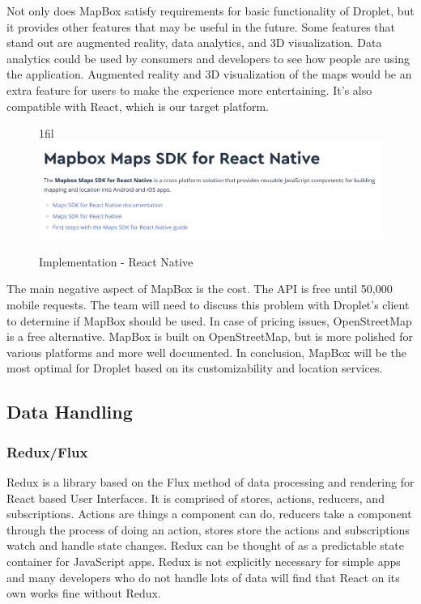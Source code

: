 \documentclass[draftclsnofoot, onecolumn, letterpaper,10pt,compsoc]{IEEEtran}
\makeatletter
\newcommand*{\centerfloat}{%
  \parindent \z@
  \leftskip \z@ \@plus 1fil \@minus \textwidth
  \rightskip\leftskip
  \parfillskip \z@skip}
\newcommand*{\centerfloat}{%
  \parindent \z@
  \leftskip \z@ \@plus 1fil \@minus \textwidth
  \rightskip\leftskip
  \parfillskip \z@skip}
\makeatother
\begin{document}
Not only does MapBox satisfy requirements for basic functionality of Droplet, but it provides other features that may be useful in the future. Some features that stand out are augmented reality, data analytics, and 3D visualization. Data analytics could be used by consumers and developers to see how people are using the application. Augmented reality and 3D visualization of the maps would be an extra feature for users to make the experience more entertaining. It's also compatible with React, which is our target platform.

\begin{figure}[H]
    \centerfloat
    \includegraphics[scale=.2]{images/MapBoxReactNative.jpg}
    \caption{Implementation - React Native}
    \label{fig:my_label}
\end{figure}

The main negative aspect of MapBox is the cost. The API is free until 50,000 mobile requests. The team will need to discuss this problem with Droplet's client to determine if MapBox should be used. In case of pricing issues, OpenStreetMap is a free alternative. MapBox is built on OpenStreetMap, but is more polished for various platforms and more well documented. In conclusion, MapBox will be the most optimal for Droplet based on its customizability and location services.

\subsection{Data Handling}

\subsubsection{Redux/Flux}
Redux is a library based on the Flux method of data processing and rendering for React based User Interfaces. It is comprised of stores, actions, reducers, and subscriptions. Actions are things a component can do, reducers take a component through the process of doing an action, stores store the actions and subscriptions watch and handle state changes. Redux can be thought of as a predictable state container for JavaScript apps. Redux is not explicitly necessary for simple apps and many developers who do not handle lots of data will find that React on its own works fine without Redux. 
\end{document}

